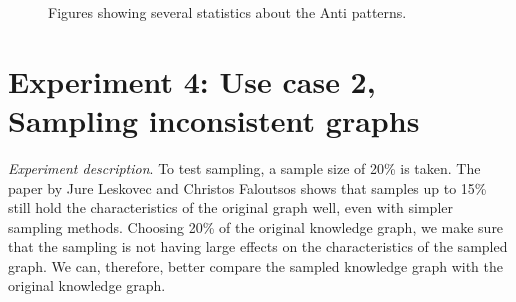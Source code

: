 \documentclass[11pt,letterpaper ,oneside ]{book}
\begin{document}
	\begin{figure}[ht]
		\centering
		\caption{Figures showing several statistics about the Anti patterns.}
		\label{fig:AntipatternStats}
	\end{figure}
	
	\section{Experiment 4: Use case 2, Sampling inconsistent graphs} 
	\textit{Experiment description}. To test sampling, a sample size of 20\% is taken. The paper by Jure Leskovec and Christos Faloutsos \cite{Leskovec:2006} shows that samples up to 15\% still hold the characteristics of the original graph well, even with simpler sampling methods. Choosing 20\% of the original knowledge graph, we make sure that the sampling is not having large effects on the characteristics of the sampled graph. We can, therefore, better compare the sampled knowledge graph with the original knowledge graph. \\
	
\end{document}
